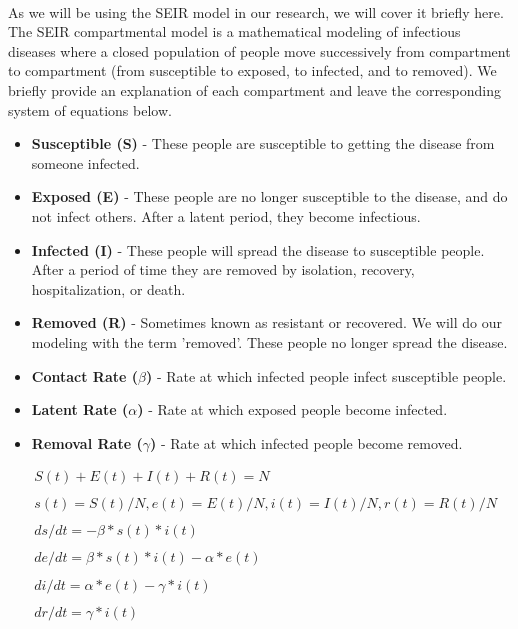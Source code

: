 \documentclass[12pt, a4, epsf] {article}
\theoremstyle{plain}
\theoremstyle{definition}
\begin{document}
\paragraph{}
As we will be using the SEIR model\cite{hethcote_2000} in our research, we will cover it briefly here. The SEIR compartmental model is a mathematical modeling of infectious diseases where a closed population of people move successively from compartment to compartment (from susceptible to exposed, to infected, and to removed). We briefly provide an explanation of each compartment and leave the corresponding system of equations below.
\begin{itemize}
	\item \textbf{Susceptible (S)} - These people are susceptible to getting the disease from someone infected.
	\item \textbf{Exposed (E)} - These people are no longer susceptible to the disease, and do not infect others. After a latent period, they become infectious.
	\item \textbf{Infected (I)} - These people will spread the disease to susceptible people. After a period of time they are removed by isolation, recovery, hospitalization, or death.
	\item \textbf{Removed (R)} - Sometimes known as resistant or recovered. We will do our modeling with the term 'removed'. These people no longer spread the disease.
	\item \textbf{Contact Rate ($\beta$)} - Rate at which infected people infect susceptible people.
	\item \textbf{Latent Rate ($\alpha$)} - Rate at which exposed people become infected.
	\item \textbf{Removal Rate ($\gamma$)} - Rate at which infected people become removed.
\end{itemize}
\begin{align*}
&S(t) + E(t) + I(t) + R(t) = N \\\\
&s(t) = S(t)/N, e(t) = E(t)/N, i(t) = I(t)/N, r(t) = R(t)/N \\\\
&ds/dt = - \beta * s(t) * i(t) \\\\
&de/dt = \beta * s(t) * i(t) - \alpha * e(t) \\\\
&di/dt = \alpha * e(t) - \gamma * i(t) \\\\
&dr/dt = \gamma * i(t) \\\\
\end{align*}
\end{document}
